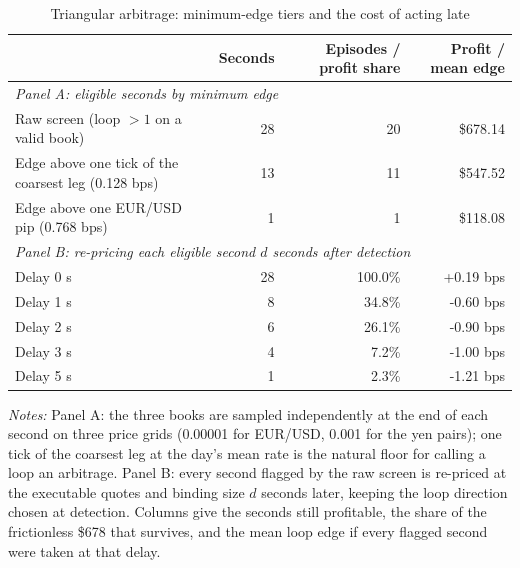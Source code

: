 \begin{table}[htbp]
\centering
\caption{Triangular arbitrage: minimum-edge tiers and the cost of acting late}
\label{tab:arbitrage_tiers_decay}
\footnotesize
\begin{tabular}{lrrr}
\toprule
 & Seconds & Episodes / profit share & Profit / mean edge \\
\midrule
\multicolumn{4}{l}{\emph{Panel A: eligible seconds by minimum edge}} \\
Raw screen (loop $>1$ on a valid book) & 28 & 20 & \$678.14 \\
Edge above one tick of the coarsest leg (0.128 bps) & 13 & 11 & \$547.52 \\
Edge above one EUR/USD pip (0.768 bps) & 1 & 1 & \$118.08 \\
\midrule
\multicolumn{4}{l}{\emph{Panel B: re-pricing each eligible second $d$ seconds after detection}} \\
Delay 0 s & 28 & 100.0\% & +0.19 bps \\
Delay 1 s & 8 & 34.8\% & -0.60 bps \\
Delay 2 s & 6 & 26.1\% & -0.90 bps \\
Delay 3 s & 4 & 7.2\% & -1.00 bps \\
Delay 5 s & 1 & 2.3\% & -1.21 bps \\
\bottomrule
\end{tabular}

\begin{minipage}{0.95\linewidth}\footnotesize\emph{Notes:} Panel A: the three books are sampled independently at the end of each second on three price grids (0.00001 for EUR/USD, 0.001 for the yen pairs); one tick of the coarsest leg at the day's mean rate is the natural floor for calling a loop an arbitrage. Panel B: every second flagged by the raw screen is re-priced at the executable quotes and binding size $d$ seconds later, keeping the loop direction chosen at detection. Columns give the seconds still profitable, the share of the frictionless \$678 that survives, and the mean loop edge if every flagged second were taken at that delay.\end{minipage}
\end{table}

